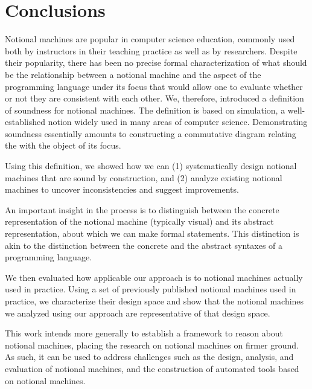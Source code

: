 \section{Conclusions}
\label{sec:Conclusions}

Notional machines
are popular in computer science education,
commonly used both by instructors in their teaching practice
as well as by researchers.
%
Despite
their popularity,
there has been no precise formal characterization of
what should be the relationship between
a notional machine
and
the aspect
of the programming language
under its focus
%
that would allow one to
evaluate whether or not they are consistent with each other.
%
%
We, therefore, introduced
a definition
of soundness for notional machines.
The definition is based on
simulation,
a
well-established notion
widely used in many areas of computer science.
%
Demonstrating soundness essentially
amounts to
constructing
a commutative diagram relating the \nm{}
with the object of its focus.


Using this definition,
we
showed how we can
(1)
systematically
design notional machines that are sound by construction,
%
and
(2)
analyze existing notional machines
to uncover inconsistencies
and suggest improvements.


An important insight
in the process
is to
distinguish between
the concrete representation of the notional machine
(typically visual)
and its abstract representation,
about which we can make formal statements.
%
This distinction is akin to the distinction between
the concrete and the abstract syntaxes of a programming language.
 
We then evaluated 
how applicable our approach is
to notional machines
actually used in practice.
%
Using
a set of
previously published notional machines
used in practice,
we characterize their design space
%
and show that
the notional machines we analyzed using our approach
are representative of that design space.


This work intends more generally to establish a
framework to reason about notional machines,
placing the research on notional machines on firmer ground.
As such,
it can be
used
to address challenges
such as the design, analysis, and evaluation of notional machines,
and
the construction of automated tools based on notional machines.


